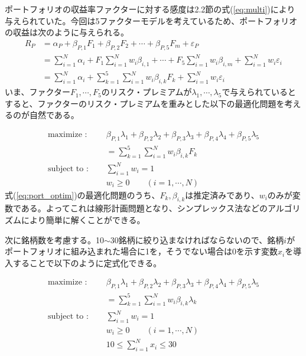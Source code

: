 \documentclass[11pt]{jreport}
\begin{document}
ポートフォリオの収益率ファクターに対する感度は2.2節の式(\ref{eq:multi})により与えられていた。今回は5ファクターモデルを考えているため、ポートフォリオの収益は次のように与えられる。
\begin{equation}
\begin{split}
R_P &= \alpha_P + \beta_{P,1} F_1 + \beta_{P,2} F_2 + \cdots + \beta_{P,5} F_m + \varepsilon_P\\
&=\sum_{i=1}^N \alpha_i + F_1 \sum_{i=1}^N w_i \beta_{i,1} + \cdots + F_5 \sum_{i=1}^N w_i \beta_{i,m} + \sum_{i=1}^N w_i\varepsilon_i\\
&= \sum_{i=1}^N \alpha_i + \sum_{k=1}^5 \sum_{i=1}^N w_i \beta_{i,k} F_k + \sum_{i=1}^N w_i\varepsilon_i
\label{eq:port}
\end{split}
\end{equation}
いま、ファクター$F_1,\cdots,F_5$のリスク・プレミアムが$\lambda_1,\cdots,\lambda_5$で与えられているとすると、ファクターのリスク・プレミアムを重みとした以下の最適化問題を考えるのが自然である。

\begin{equation}
\begin{split}
\text{maximize : }\quad & \beta_{P,1}\lambda_1 + \beta_{P,2}\lambda_2 + \beta_{P,3}\lambda_3 + \beta_{P,4}\lambda_4 + \beta_{P,5}\lambda_5\\
& = \sum_{k=1}^5 \sum_{i=1}^N w_i \beta_{i,k} F_k\\
\text{subject to : }\quad & \sum_{i=1}^N w_i = 1\\
& w_i \geq 0\qquad(i=1,\cdots,N)
\end{split}
\label{eq:port_optim}
\end{equation}
式(\ref{eq:port_optim})の最適化問題のうち、$F_k, \beta_{i,k}$は推定済みであり、$w_i$のみが変数である。よってこれは線形計画問題となり、シンプレックス法などのアルゴリズムにより簡単に解くことができる。

次に銘柄数を考慮する。10$\sim$30銘柄に絞り込まなければならないので、銘柄$i$がポートフォリオに組み込まれた場合に1を，そうでない場合は0を示す変数$x_i$を導入することで以下のように定式化できる。

\begin{equation}
\begin{split}
\text{maximize : }\quad & \beta_{P,1}\lambda_1 + \beta_{P,2}\lambda_2 + \beta_{P,3}\lambda_3 + \beta_{P,4}\lambda_4 + \beta_{P,5}\lambda_5\\
& = \sum_{k=1}^5 \sum_{i=1}^N w_i \beta_{i,k} \lambda_k\\
\text{subject to : }\quad & \sum_{i=1}^N w_i = 1\\
& w_i \geq 0\qquad(i=1,\cdots,N)\\
&10 \leq \sum_{i=1}^Nx_i \leq 30
\end{split}
\label{eq:port_optim}
\end{equation}
\end{document}
